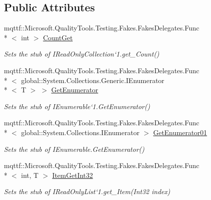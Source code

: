 \subsection*{Public Attributes}
\begin{DoxyCompactItemize}
\item 
mqttf\-::\-Microsoft.\-Quality\-Tools.\-Testing.\-Fakes.\-Fakes\-Delegates.\-Func\\*
$<$ int $>$ \hyperlink{class_system_1_1_collections_1_1_generic_1_1_fakes_1_1_stub_i_read_only_list_3_01_t_01_4_ac18726545db157627c79a7dfd83e5a1a}{Count\-Get}
\begin{DoxyCompactList}\small\item\em Sets the stub of I\-Read\-Only\-Collection`1.get\-\_\-\-Count()\end{DoxyCompactList}\item 
mqttf\-::\-Microsoft.\-Quality\-Tools.\-Testing.\-Fakes.\-Fakes\-Delegates.\-Func\\*
$<$ global\-::\-System.\-Collections.\-Generic.\-I\-Enumerator\\*
$<$ T $>$ $>$ \hyperlink{class_system_1_1_collections_1_1_generic_1_1_fakes_1_1_stub_i_read_only_list_3_01_t_01_4_a302045c44d9556063fdda6ff66820ad6}{Get\-Enumerator}
\begin{DoxyCompactList}\small\item\em Sets the stub of I\-Enumerable`1.Get\-Enumerator()\end{DoxyCompactList}\item 
mqttf\-::\-Microsoft.\-Quality\-Tools.\-Testing.\-Fakes.\-Fakes\-Delegates.\-Func\\*
$<$ global\-::\-System.\-Collections.\-I\-Enumerator $>$ \hyperlink{class_system_1_1_collections_1_1_generic_1_1_fakes_1_1_stub_i_read_only_list_3_01_t_01_4_af1efd1eeec29971bec082b35a8cb06b8}{Get\-Enumerator01}
\begin{DoxyCompactList}\small\item\em Sets the stub of I\-Enumerable.\-Get\-Enumerator()\end{DoxyCompactList}\item 
mqttf\-::\-Microsoft.\-Quality\-Tools.\-Testing.\-Fakes.\-Fakes\-Delegates.\-Func\\*
$<$ int, T $>$ \hyperlink{class_system_1_1_collections_1_1_generic_1_1_fakes_1_1_stub_i_read_only_list_3_01_t_01_4_a48b8d9688254896b8c9bd82138e89f12}{Item\-Get\-Int32}
\begin{DoxyCompactList}\small\item\em Sets the stub of I\-Read\-Only\-List`1.get\-\_\-\-Item(\-Int32 index)\end{DoxyCompactList}\end{DoxyCompactItemize}



